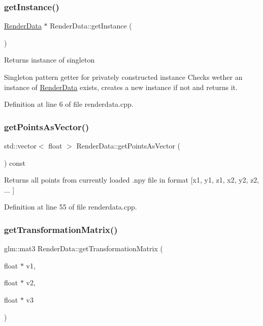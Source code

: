 \subsubsection{\texorpdfstring{get\+Instance()}{getInstance()}}
{\footnotesize\ttfamily \hyperlink{class_render_data}{Render\+Data} $\ast$ Render\+Data\+::get\+Instance (\begin{DoxyParamCaption}{ }\end{DoxyParamCaption})\hspace{0.3cm}{\ttfamily [static]}}

\begin{DoxyReturn}{Returns}
instance of singleton
\end{DoxyReturn}
Singleton pattern getter for privately constructed instance Checks wether an instance of \hyperlink{class_render_data}{Render\+Data} exists, creates a new instance if not and returns it. 

Definition at line 6 of file renderdata.\+cpp.

\mbox{\label{class_render_data_a24e60dcccd94c47c02e0e47f2ca7b5c2}} 
\subsubsection{\texorpdfstring{get\+Points\+As\+Vector()}{getPointsAsVector()}}
{\footnotesize\ttfamily std\+::vector$<$ float $>$ Render\+Data\+::get\+Points\+As\+Vector (\begin{DoxyParamCaption}{ }\end{DoxyParamCaption}) const}

\begin{DoxyReturn}{Returns}
all points from currently loaded .npy file in format \mbox{[}x1, y1, z1, x2, y2, z2, ... \mbox{]} 
\end{DoxyReturn}


Definition at line 55 of file renderdata.\+cpp.

\mbox{\label{class_render_data_afbc604f853739d0198c9da5097987fa7}} 
\subsubsection{\texorpdfstring{get\+Transformation\+Matrix()}{getTransformationMatrix()}}
{\footnotesize\ttfamily glm\+::mat3 Render\+Data\+::get\+Transformation\+Matrix (\begin{DoxyParamCaption}\item[{float $\ast$}]{v1,  }\item[{float $\ast$}]{v2,  }\item[{float $\ast$}]{v3 }\end{DoxyParamCaption})\hspace{0.3cm}{\ttfamily [private]}}

